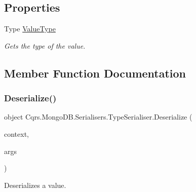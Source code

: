 \subsection*{Properties}
\begin{DoxyCompactItemize}
\item 
Type \hyperlink{classCqrs_1_1MongoDB_1_1Serialisers_1_1TypeSerialiser_af5d06e2fe995f816c840a8ceefd22991_af5d06e2fe995f816c840a8ceefd22991}{Value\+Type}
\begin{DoxyCompactList}\small\item\em Gets the type of the value. \end{DoxyCompactList}\end{DoxyCompactItemize}


\subsection{Member Function Documentation}
\mbox{\label{classCqrs_1_1MongoDB_1_1Serialisers_1_1TypeSerialiser_a5e8aa7ae1372033da215d02b79947b20_a5e8aa7ae1372033da215d02b79947b20}} 
\subsubsection{\texorpdfstring{Deserialize()}{Deserialize()}}
{\footnotesize\ttfamily object Cqrs.\+Mongo\+D\+B.\+Serialisers.\+Type\+Serialiser.\+Deserialize (\begin{DoxyParamCaption}\item[{Bson\+Deserialization\+Context}]{context,  }\item[{Bson\+Deserialization\+Args}]{args }\end{DoxyParamCaption})}



Deserializes a value. 


